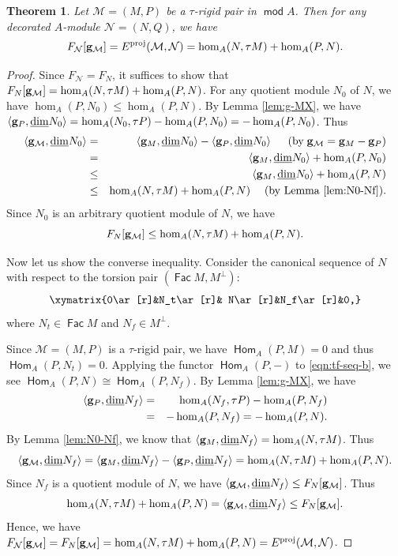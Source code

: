 \documentclass[10pt]{amsart}
\newtheorem{theorem}{Theorem}[section]
\theoremstyle{definition}
\theoremstyle{remark}
\numberwithin{equation}{section}
\def\mod{\opname{mod}\nolimits}
\newcommand{\opname}[1]{\operatorname{\mathsf{#1}}}
\newcommand{\Fac}{\opname{Fac}}
\newcommand{\Hom}{\opname{Hom}}
\begin{document}
\begin{theorem}
\label{thm:FE-hom}
Let $\mathcal M=(M,P)$ be a $\tau$-rigid pair in $\mod A$. Then for any decorated $A$-module $\mathcal N=(N,Q)$, we have 
 \[F_{\mathcal N}[{\bf g}_{\mathcal M}]=E^{\rm proj}(\mathcal M,\mathcal N)=\hom_A(N,\tau M)+\hom_A(P,N).\] 
\end{theorem}
\begin{proof}
Since $F_{\mathcal N}=F_N$, it suffices to show that $F_{N}[{\bf g}_{\mathcal M}]=\hom_A(N,\tau M)+\hom_A(P,N)$. For any quotient module $N_0$ of $N$, we have $\hom_A(P,N_0)\leq \hom_A(P,N)$. By Lemma \ref{lem:g-MX}, we have $\langle {\bf g}_{P},\underline{\dim} N_0\rangle=\hom_A(N_0,\tau P)-\hom_A(P, N_0)=-\hom_A(P, N_0)$.
Thus
\begin{eqnarray*}
    \langle {\bf g}_{\mathcal M},\underline{\dim} N_0\rangle&=& \langle {\bf g}_{M},\underline{\dim} N_0\rangle-\langle {\bf g}_{P},\underline{\dim} N_0\rangle \quad\;\;(\text{by\;} {\bf g}_{\mathcal M}={\bf g}_M-{\bf g}_{P})\\
    &=&\langle {\bf g}_{M},\underline{\dim} N_0\rangle+ \hom_A(P,N_0)\\
    &\leq&\langle {\bf g}_{M},\underline{\dim} N_0\rangle+\hom_A(P,N)\\
    &\leq& \hom_A(N,\tau M)+\hom_A(P,N) \quad\;\text{(by Lemma \ref{lem:N0-Nf}).}
\end{eqnarray*}
Since $N_0$ is an arbitrary quotient module of $N$, we have \[F_N[{\bf g}_{\mathcal M}]\leq \hom_A(N,\tau M)+\hom_A(P,N).\] 


Now let us show the converse inequality. Consider the canonical sequence of $N$ with respect to the torsion pair  $(\Fac M, M^\bot)$:
\begin{eqnarray}\label{eqn:tf-seq-b}
\xymatrix{0\ar[r]&N_t\ar[r]& N\ar[r]&N_f\ar[r]&0,}
\end{eqnarray}
where $N_t\in\Fac M$ and $N_f\in M^\bot$. 

Since $\mathcal M=(M,P)$ is a $\tau$-rigid pair, we have $\Hom_A(P,M)=0$ and thus $\Hom_A(P, N_t)=0$. Applying the functor $\Hom_A(P,-)$ to \eqref{eqn:tf-seq-b}, we see $\Hom_A(P,N)\cong \Hom_A(P, N_f)$. By Lemma \ref{lem:g-MX}, we have
\begin{eqnarray*}
    \langle {\bf g}_P, \underline{\dim} N_f\rangle&=&\hom_A(N_f,\tau P)-\hom_A(P, N_f)\\
    &=&-\hom_A(P, N_f)=-\hom_A(P, N).
\end{eqnarray*}
By Lemma \ref{lem:N0-Nf}, we know that $ \langle {\bf g}_{M},\underline{\dim} N_f\rangle=\hom_A(N,\tau M)$. Thus
\[
 \langle {\bf g}_{\mathcal M},\underline{\dim} N_f\rangle= \langle {\bf g}_{M},\underline{\dim} N_f\rangle- \langle {\bf g}_{P},\underline{\dim} N_f\rangle=\hom_A(N,\tau M)+\hom_A(P, N).
\]
Since $N_f$ is a quotient module of $N$, we have $\langle {\bf g}_{\mathcal M},\underline{\dim} N_f\rangle\leq F_N[{\bf g}_{\mathcal M}]$. Thus
\[
\hom_A(N,\tau M)+\hom_A(P, N)=\langle {\bf g}_{\mathcal M},\underline{\dim} N_f\rangle\leq F_N[{\bf g}_{\mathcal M}].
\]
Hence, we have $F_{\mathcal N}[{\bf g}_{\mathcal M}]=F_N[{\bf g}_{\mathcal M}]=\hom_A(N,\tau M)+\hom_A(P,N)=E^{\rm proj}(\mathcal M,\mathcal N)$.
\end{proof}
\end{document}

